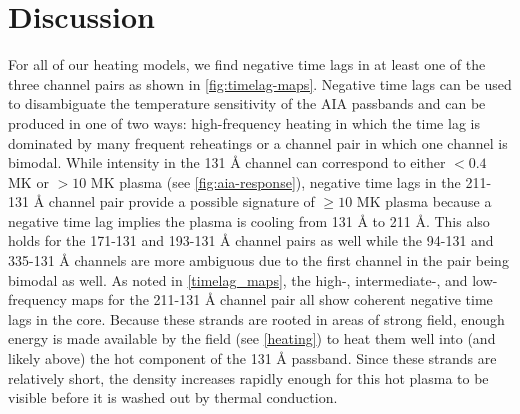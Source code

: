 
\section{Discussion}\label{discussion}

For all of our heating models, we find negative time lags in at least one of the three channel pairs as shown in \autoref{fig:timelag-maps}. Negative time lags can be used to disambiguate the temperature sensitivity of the AIA passbands and can be produced in one of two ways: high-frequency heating in which the time lag is dominated by many frequent reheatings or a channel pair in which one channel is bimodal. While intensity in the 131 \AA{} channel can correspond to either $<0.4$ MK or $>10$ MK plasma (see \autoref{fig:aia-response}), negative time lags in the 211-131 \AA{} channel pair provide a possible signature of $\ge10$ MK plasma because a negative time lag implies the plasma is cooling from 131 \AA{} to 211 \AA{}. This also holds for the 171-131 and 193-131 \AA{} channel pairs as well while the 94-131 and 335-131 \AA{} channels are more ambiguous due to the first channel in the pair being bimodal as well. As noted in \autoref{timelag_maps}, the high-, intermediate-, and low-frequency maps for the 211-131 \AA{} channel pair all show coherent negative time lags in the core. Because these strands are rooted in areas of strong field, enough energy is made available by the field (see \autoref{heating}) to heat them well into (and likely above) the hot component of the 131 \AA{} passband. Since these strands are relatively short, the density increases rapidly enough for this hot plasma to be visible before it is washed out by thermal conduction.

